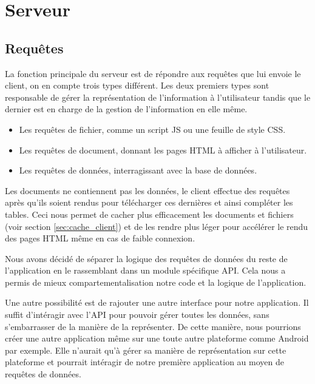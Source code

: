 \documentclass{EPL-master-thesis-covers-FR}
\begin{document}
		\section{Serveur}
			\label{sec:serveur}



			\subsection{Requêtes}

				La fonction principale du serveur est de répondre aux requêtes que lui envoie le client, on en compte trois types différent. Les deux premiers types sont responsable de gérer la représentation de l'information à l'utilisateur tandis que le dernier est en charge de la gestion de l'information en elle même.

				\begin{itemize}
					\item Les requêtes de fichier, comme un script JS ou une feuille de style CSS.
					\item Les requêtes de document, donnant les pages HTML à afficher à l'utilisateur.
					\item Les requêtes de données, interragissant avec la base de données.
				\end{itemize}

				Les documents ne contiennent pas les données, le client effectue des requêtes après qu'ils soient rendus pour télécharger ces dernières et ainsi compléter les tables. Ceci nous permet de cacher plus efficacement les documents et fichiers (voir section \ref{sec:cache_client}) et de les rendre plus léger pour accélérer le rendu des pages HTML même en cas de faible connexion.

				Nous avons décidé de séparer la logique des requêtes de données du reste de l'application en le rassemblant dans un module spécifique API. Cela nous a permis de mieux compartementalisation notre code et la logique de l'application.

				Une autre possibilité est de rajouter une autre interface pour notre application. Il suffit d'intéragir avec l'API pour pouvoir gérer toutes les données, sans s'embarrasser de la manière de la représenter. De cette manière, nous pourrions créer une autre application même sur une toute autre plateforme comme Android par exemple. Elle n'aurait qu'à gérer sa manière de représentation sur cette plateforme et pourrait intéragir de notre première application au moyen de requêtes de données.
\end{document}
